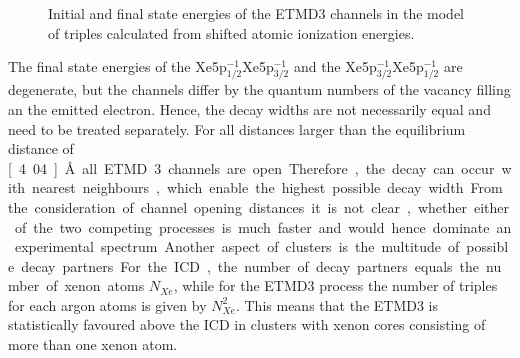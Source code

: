 \begin{figure}[htb]
 \centering
 
 \caption{Initial and final state energies of the \ac{ETMD}3 channels
          in the model of triples calculated from shifted atomic ionization
          energies.}
 \label{figure:ArXe_energy_etmd_curves}
\end{figure}

The final state energies of the Xe5p$_{1/2}^{-1}$Xe5p$_{3/2}^{-1}$ and
the Xe5p$_{3/2}^{-1}$Xe5p$_{1/2}^{-1}$ are degenerate, but the channels
differ by the quantum
numbers of the vacancy filling an the emitted electron. Hence, the decay
widths are not necessarily equal and need to be treated separately.
For all distances larger than the equilibrium distance of \unit[4.04]{\AA}
all \ac{ETMD}3 channels are open. Therefore, the decay can occur with
nearest neighbours, which enable the highest possible decay width.

From the consideration of channel opening distances it is not clear, whether
either of the two competing processes is much faster and would hence dominate
an experimental spectrum. Another aspect of clusters is the multitude of
possible decay partners. For the \ac{ICD}, the number of decay partners equals
the number of xenon atoms $N_{Xe}$, while for the \ac{ETMD}3 process the number
of triples for each argon atoms is given by $N_{Xe}^2$. This means that
the \ac{ETMD}3 is statistically favoured above the \ac{ICD} in clusters with
xenon cores consisting of more than one xenon atom.

\begin{figure}[ht]
 \centering
 
 
 \caption{}
 \label{figure:arxe_model}
\end{figure}





\begin{figure}
 \centering
 
 \caption{}
 \label{figure:exp_309ico_arxe}
\end{figure}



\begin{figure}
 \centering
 
 
 \caption{}
 \label{figure:exp_923ico_arxe}
\end{figure}

% 
